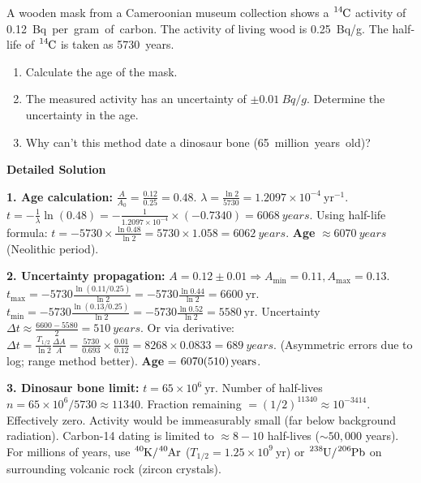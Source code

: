 \documentclass[11pt]{article}
\begin{document}
\begin{exoresolu}
A wooden mask from a Cameroonian museum collection shows a $\ce{^{14}C}$ activity of \SI{0.12}{Bq per gram of carbon}. The activity of living wood is \SI{0.25}{Bq/g}. The half-life of $\ce{^{14}C}$ is taken as \SI{5730}{years}.
\begin{enumerate}
\item Calculate the age of the mask.
\item The measured activity has an uncertainty of $\pm \SI{0.01}{Bq/g}$. Determine the uncertainty in the age.
\item Why can't this method date a dinosaur bone (\SI{65}{million years old})?
\end{enumerate}
\tcblower
\textbf{Detailed Solution}

\textbf{1. Age calculation:}
$\frac{A}{A_0} = \frac{0.12}{0.25} = 0.48$.
$\lambda = \frac{\ln 2}{5730} = 1.2097 \times 10^{-4}\ \text{yr}^{-1}$.
$t = -\frac{1}{\lambda} \ln(0.48) = -\frac{1}{1.2097 \times 10^{-4}} \times (-0.7340) = \SI{6068}{years}$.
Using half-life formula: $t = -5730 \times \frac{\ln 0.48}{\ln 2} = 5730 \times 1.058 = \SI{6062}{years}$.
\textbf{Age} $\approx \SI{6070}{years}$ (Neolithic period).

\textbf{2. Uncertainty propagation:}
$A = 0.12 \pm 0.01 \Rightarrow A_{\text{min}} = 0.11, A_{\text{max}} = 0.13$.
$t_{\text{max}} = -5730 \frac{\ln(0.11/0.25)}{\ln 2} = -5730 \frac{\ln 0.44}{\ln 2} = 6600\ \text{yr}$.
$t_{\text{min}} = -5730 \frac{\ln(0.13/0.25)}{\ln 2} = -5730 \frac{\ln 0.52}{\ln 2} = 5580\ \text{yr}$.
Uncertainty $\Delta t \approx \frac{6600 - 5580}{2} = \SI{510}{years}$.
Or via derivative: $\Delta t = \frac{T_{1/2}}{\ln 2} \frac{\Delta A}{A} = \frac{5730}{0.693} \times \frac{0.01}{0.12} = 8268 \times 0.0833 = \SI{689}{years}$.
(Asymmetric errors due to log; range method better). \textbf{Age} = $\SI{6070 \pm 510}{years}$.

\textbf{3. Dinosaur bone limit:}
$t = 65 \times 10^6\ \text{yr}$. Number of half-lives $n = 65 \times 10^6 / 5730 \approx 11340$.
Fraction remaining $= (1/2)^{11340} \approx 10^{-3414}$. Effectively zero.
Activity would be immeasurably small (far below background radiation). Carbon-14 dating is limited to $\approx 8-10$ half-lives ($\sim 50,000$ years). For millions of years, use $\ce{^{40}K}/\ce{^{40}Ar}$ ($T_{1/2}=1.25\times 10^9\ \text{yr}$) or $\ce{^{238}U}/\ce{^{206}Pb}$ on surrounding volcanic rock (zircon crystals).
\end{exoresolu}
\end{document}
